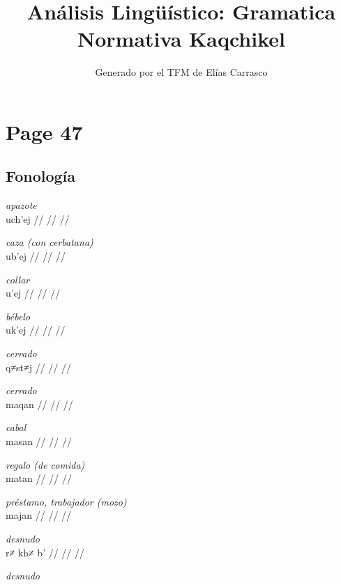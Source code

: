 \documentclass{article}%
\title{Análisis Lingüístico: Gramatica Normativa Kaqchikel}%
\author{Generado por el TFM de Elías Carrasco}%
\begin{document}
%
\normalsize%
\maketitle%
\section{Page 47}%
\label{sec:Page47}%
\subsection{Fonología}%
\label{subsec:Fonologa}%

%
\par\medskip%
\ex
\textit{apazote} \\
\begingl
\gla uch'ej //
\glb  //
\glc  //
\endgl
\xe
%
\medskip%
\par\medskip%
\ex
\textit{caza (con cerbatana)} \\
\begingl
\gla ub'ej //
\glb  //
\glc  //
\endgl
\xe
%
\medskip%
\par\medskip%
\ex
\textit{collar} \\
\begingl
\gla u'ej //
\glb  //
\glc  //
\endgl
\xe
%
\medskip%
\par\medskip%
\ex
\textit{bébelo} \\
\begingl
\gla uk'ej //
\glb  //
\glc  //
\endgl
\xe
%
\medskip%
\par\medskip%
\ex
\textit{cerrado} \\
\begingl
\gla q≠st≠j //
\glb  //
\glc  //
\endgl
\xe
%
\medskip%
\par\medskip%
\ex
\textit{cerrado} \\
\begingl
\gla maqan //
\glb  //
\glc  //
\endgl
\xe
%
\medskip%
\par\medskip%
\ex
\textit{cabal} \\
\begingl
\gla masan //
\glb  //
\glc  //
\endgl
\xe
%
\medskip%
\par\medskip%
\ex
\textit{regalo (de comida)} \\
\begingl
\gla matan //
\glb  //
\glc  //
\endgl
\xe
%
\medskip%
\par\medskip%
\ex
\textit{préstamo, trabajador (mozo)} \\
\begingl
\gla majan //
\glb  //
\glc  //
\endgl
\xe
%
\medskip%
\par\medskip%
\ex
\textit{desnudo} \\
\begingl
\gla r≠ kh≠ b' //
\glb  //
\glc  //
\endgl
\xe
%
\medskip%
\par\medskip%
\ex
\textit{desnudo} \\
\end{document}
